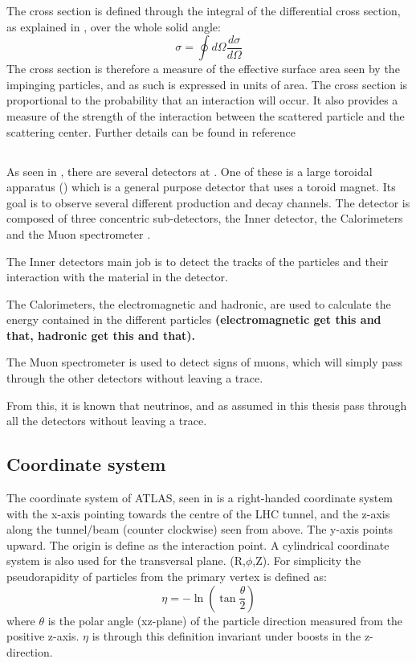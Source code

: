 The cross section is defined through the integral of the differential cross section, as explained in , over the whole solid angle:
\begin{equation}
\sigma = \oint d\Omega \frac{d\sigma}{d\Omega}
\end{equation}
The cross section is therefore a measure of the effective surface area seen by the impinging particles, and as such is expressed in units of area. The cross section is proportional to the probability that an interaction will occur. It also provides a measure of the strength of the interaction between the scattered particle and the scattering center.
Further details can be found in reference~\citep{Herr:2006}

\subsection{\abbrATLAS}
As seen in , there are several detectors at \abbrCERN. One of these is a large toroidal \abbrLHC apparatus (\abbrATLAS) which is a general purpose detector that uses a toroid magnet. Its goal is to observe several different production and decay channels. The detector is composed of three concentric sub-detectors, the Inner detector, the Calorimeters and the Muon spectrometer \citep{1129811}.

The Inner detectors main job is to detect the tracks of the particles and their interaction with the material in the detector.

The Calorimeters, the electromagnetic and hadronic, are used to calculate the energy contained in the different particles \textbf{(electromagnetic get this and that, hadronic get this and that). }

The Muon spectrometer is used to detect signs of muons, which will simply pass through the other detectors without leaving a trace.

From this, it is known that neutrinos, and as assumed in this thesis \abbrWIMPS pass through all the detectors without leaving a trace.
\subsection{Coordinate system}\label{sec:eo:subsec:coord}
The coordinate system of ATLAS, seen in  is a right-handed coordinate system with the x-axis pointing towards the centre of the LHC tunnel, and the z-axis along the tunnel/beam (counter clockwise) seen from above. The y-axis points upward.
The origin is define as the interaction point.
A cylindrical coordinate system is also used for the transversal plane. (R,$\phi$,Z).
For simplicity the pseudorapidity of particles from the primary vertex is defined as:
\begin{equation}
\eta = - \ln( \tan\frac{\theta}{2})
\end{equation}
where $\theta$ is the polar angle (xz-plane) of the particle direction measured from the positive z-axis. 
$\eta$ is through this definition invariant under boosts in the z-direction.

